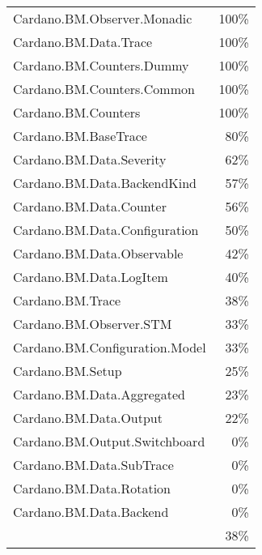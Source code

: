 \begin{tabular}{l r}
   Cardano.BM.Observer.Monadic & 100\% \\
   Cardano.BM.Data.Trace & 100\% \\
   Cardano.BM.Counters.Dummy & 100\% \\
   Cardano.BM.Counters.Common & 100\% \\
   Cardano.BM.Counters & 100\% \\
   Cardano.BM.BaseTrace & 80\% \\
   Cardano.BM.Data.Severity & 62\% \\
   Cardano.BM.Data.BackendKind & 57\% \\
   Cardano.BM.Data.Counter & 56\% \\
   Cardano.BM.Data.Configuration & 50\% \\
   Cardano.BM.Data.Observable & 42\% \\
   Cardano.BM.Data.LogItem & 40\% \\
   Cardano.BM.Trace & 38\% \\
   Cardano.BM.Observer.STM & 33\% \\
   Cardano.BM.Configuration.Model & 33\% \\
   Cardano.BM.Setup & 25\% \\
   Cardano.BM.Data.Aggregated & 23\% \\
   Cardano.BM.Data.Output & 22\% \\
   Cardano.BM.Output.Switchboard & 0\% \\
   Cardano.BM.Data.SubTrace & 0\% \\
   Cardano.BM.Data.Rotation & 0\% \\
   Cardano.BM.Data.Backend & 0\% \\
    & 38\% \\
\end{tabular}
